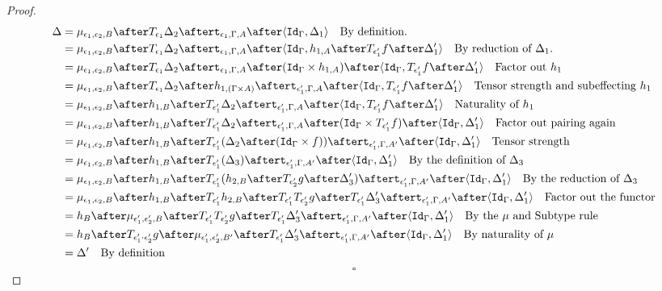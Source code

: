 \documentclass{Report}
\begin{document}
\begin{framed}
\begin{proof}
        \begin{align*}
            \D &= \bind{\e_1}{\e_2}{B}\after \T{\e_1}{\D_2}\after\tstrength{\e_1}{\G}{A}\after\pr{\idg}{\D_1}\qt{By definition.}\\
            &= \bind{\e_1}{\e_2}{B}\after \T{\e_1}{\D_2}\after\tstrength{\e_1}{\G}{A}\after\pr{\idg}{h_{1, A}\after\T{\e_1'}{f}\after\D_1'}\qt{By reduction of $\D_1$.}\\
            &= \bind{\e_1}{\e_2}{B}\after \T{\e_1}{\D_2}\after\tstrength{\e_1}{\G}{A}\after(\idg\times h_{1, A})\after\pr{\idg}{\T{\e_1'}{f}\after\D_1'}\qt{Factor out $h_1$}\\
            &= \bind{\e_1}{\e_2}{B}\after \T{\e_1}{\D_2}\after
            h_{1, (\G\times A)}\after
            \tstrength{\e_1'}{\G}{A}\after\pr{\idg}{\T{\e_1'}{f}\after\D_1'}\qt{Tensor strength and subeffecting $h_1$}\\
            &= \bind{\e_1}{\e_2}{B}\after 
            h_{1, B}\after\T{\e_1'}{\D_2}\after
            \tstrength{\e_1'}{\G}{A}\after\pr{\idg}{\T{\e_1'}{f}\after\D_1'}\qt{Naturality of $h_1$}\\
            &= \bind{\e_1}{\e_2}{B}\after 
            h_{1, B}\after\T{\e_1'}{\D_2}\after
            \tstrength{\e_1'}{\G}{A}\after(\idg\times \T{\e_1'}{f})\after\pr{\idg}{\D_1'}\qt{Factor out pairing again}\\
            &= \bind{\e_1}{\e_2}{B}\after 
            h_{1, B}\after\T{\e_1'}{(\D_2\after(\idg\times f))}\after
            \tstrength{\e_1'}{\G}{A'}\after\pr{\idg}{\D_1'}\qt{Tensor strength}\\
            &= \bind{\e_1}{\e_2}{B}\after 
            h_{1, B}\after\T{\e_1'}{(\D_3)}\after
            \tstrength{\e_1'}{\G}{A'}\after\pr{\idg}{\D_1'}\qt{By the definition of $\D_3$}\\
            &= \bind{\e_1}{\e_2}{B}\after 
            h_{1, B}\after\T{\e_1'}{(h_{2, B}\after\T{\e_2'}{g}\after \D_3')}\after
            \tstrength{\e_1'}{\G}{A'}\after\pr{\idg}{\D_1'}\qt{By the reduction of $\D_3$}\\
            &= \bind{\e_1}{\e_2}{B}\after 
            h_{1, B}\after\T{\e_1'}{h_{2, B}}\after\T{\e_1'}{\T{\e_2'}{g}}\after \T{\e_1'}{\D_3'}\after
            \tstrength{\e_1'}{\G}{A'}\after\pr{\idg}{\D_1'}\qt{Factor out the functor}\\
            &= h_B\after\bind{\e_1'}{\e_2'}{B}\after\T{\e_1'}{\T{\e_2'}{g}}\after \T{\e_1'}{\D_3'}\after
            \tstrength{\e_1'}{\G}{A'}\after\pr{\idg}{\D_1'}\qt{By the $\mu$ and Subtype rule }\\
            & = h_B\after\T{\e_1'\dot\e_2'}{g}\after\bind{\e_1'}{\e_2'}{B'}\after \T{\e_1'}{\D_3'}\after
            \tstrength{\e_1'}{\G}{A'}\after\pr{\idg}{\D_1'}\qt{By naturality of $\bindmu$ }\\
            & = \D' \qt{By definition}
        \end{align*}
        $$\square$$
    \end{proof}
\end{framed}
\end{document}
